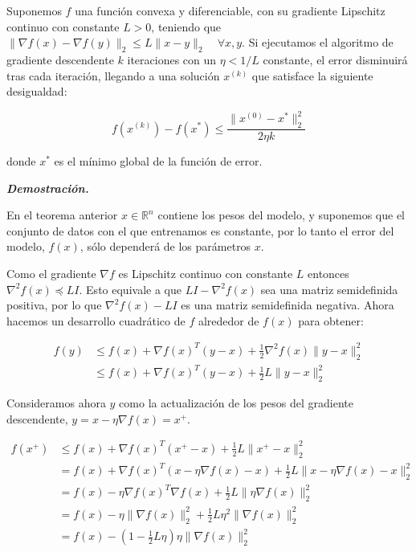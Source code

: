 \begin{teorema}\label{proof:gdconvex}
    Suponemos $f$ una función convexa y diferenciable, con su gradiente Lipschitz continuo con constante $L>0$, teniendo que $\| \nabla f(x) - \nabla f(y) \|_2 \leq L \|x-y\|_2 \quad \forall x, y$. Si ejecutamos el algoritmo de gradiente descendente $k$ iteraciones con un $\eta<1/L$ constante, el error disminuirá tras cada iteración, llegando a una solución $x^{(k)}$ que satisface la siguiente desigualdad:

    $$f(x^{(k)})-f(x^*) \leq \frac{\|x^{(0)}-x^* \|^2_2}{2\eta k}$$

    donde $x^*$ es el mínimo global de la función de error. 
\end{teorema}

\vspace{1cm}

\begin{flushleft}
   \textbf{\textit{Demostración.}}
\end{flushleft} 



En el teorema anterior $x \in \mathbb{R}^n$ contiene los pesos del modelo, y suponemos que el conjunto de datos con el que entrenamos es constante, por lo tanto el error del modelo, $f(x)$, sólo dependerá de los parámetros $x$.

Como el gradiente $\nabla f$ es Lipschitz continuo con constante $L$ entonces $\nabla ^2 f(x) \preceq LI$. Esto equivale a que $ \textstyle LI- \nabla^2f(x) $ sea una matriz semidefinida positiva, por lo que $\nabla ^2 f(x) -LI$ es una matriz semidefinida negativa. Ahora hacemos un desarrollo cuadrático de $f$ alrededor de $f(x)$ para obtener:

\begin{align*}
    f(y) &\leq f(x) + \nabla f(x)^T (y-x) +\frac{1}{2}\nabla^2 f(x) \|y-x\|^2_2  \\
    &\leq f(x) + \nabla f(x)^T(y-x) + \frac{1}{2}L \|y - x \|^2_2
\end{align*}

Consideramos ahora $y$ como la actualización de los pesos del gradiente descendente, $y=x - \eta \nabla f(x)=x^+$. 


\begin{align*}
    f(x^+) &\leq f(x) + \nabla f(x)^T(x^+-x) + \frac{1}{2}L \|x^+ - x \|^2_2 \\
    &= f(x) + \nabla f(x)^T(x - \eta \nabla f(x) -x) + \frac{1}{2}L \|x - \eta \nabla f(x) - x \|^2_2 \\
    &= f(x) - \eta \nabla f(x)^T \nabla f(x) + \frac{1}{2} L \| \eta \nabla f(x) \|^2_2 \\
    &= f(x) - \eta \| \nabla f(x) \|^2_2 + \frac{1}{2} L \eta^2 \| \nabla f(x) \|^2_2 \\
    &= f(x) - (1- \frac{1}{2}L \eta) \eta \| \nabla f(x) \|^2_2
\end{align*}


